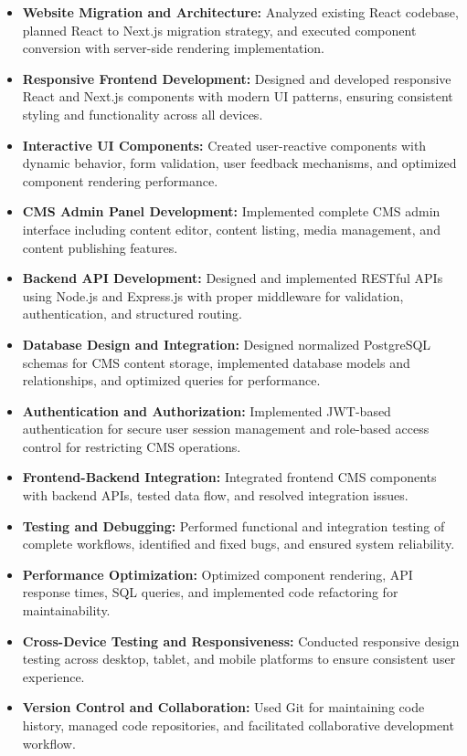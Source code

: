 \begin{itemize}

\item \textbf{Website Migration and Architecture:}  
Analyzed existing React codebase, planned React to Next.js migration strategy, and executed component conversion with server-side rendering implementation.

\item \textbf{Responsive Frontend Development:}  
Designed and developed responsive React and Next.js components with modern UI patterns, ensuring consistent styling and functionality across all devices.

\item \textbf{Interactive UI Components:}  
Created user-reactive components with dynamic behavior, form validation, user feedback mechanisms, and optimized component rendering performance.

\item \textbf{CMS Admin Panel Development:}  
Implemented complete CMS admin interface including content editor, content listing, media management, and content publishing features.

\item \textbf{Backend API Development:}  
Designed and implemented RESTful APIs using Node.js and Express.js with proper middleware for validation, authentication, and structured routing.

\item \textbf{Database Design and Integration:}  
Designed normalized PostgreSQL schemas for CMS content storage, implemented database models and relationships, and optimized queries for performance.

\item \textbf{Authentication and Authorization:}  
Implemented JWT-based authentication for secure user session management and role-based access control for restricting CMS operations.

\item \textbf{Frontend-Backend Integration:}  
Integrated frontend CMS components with backend APIs, tested data flow, and resolved integration issues.

\item \textbf{Testing and Debugging:}  
Performed functional and integration testing of complete workflows, identified and fixed bugs, and ensured system reliability.

\item \textbf{Performance Optimization:}  
Optimized component rendering, API response times, SQL queries, and implemented code refactoring for maintainability.

\item \textbf{Cross-Device Testing and Responsiveness:}  
Conducted responsive design testing across desktop, tablet, and mobile platforms to ensure consistent user experience.

\item \textbf{Version Control and Collaboration:}  
Used Git for maintaining code history, managed code repositories, and facilitated collaborative development workflow.

\end{itemize}